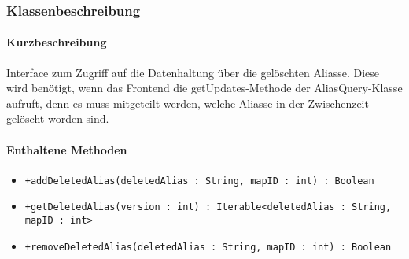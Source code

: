 \subsubsection*{Klassenbeschreibung}%
\paragraph*{Kurzbeschreibung}
Interface zum Zugriff auf die Datenhaltung über die gelöschten Aliasse. Diese wird benötigt, wenn das Frontend die getUpdates-Methode der AliasQuery-Klasse aufruft, 
denn es muss mitgeteilt werden, welche Aliasse in der Zwischenzeit gelöscht worden sind.

\paragraph*{Enthaltene Methoden}
\begin{itemize}
    \item \texttt{+addDeletedAlias(deletedAlias : String, mapID : int) : Boolean}
    \item \texttt{+getDeletedAlias(version : int) : Iterable<deletedAlias : String, mapID : int>}
    \item \texttt{+removeDeletedAlias(deletedAlias : String, mapID : int) : Boolean}
\end{itemize}
